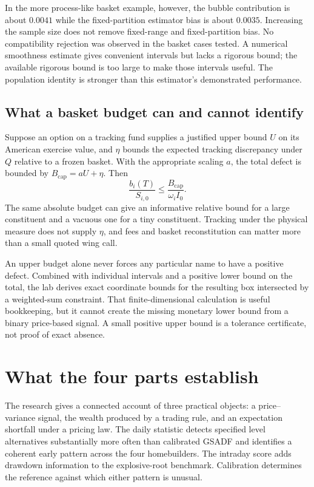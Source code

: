 In the more process-like basket example, however, the bubble contribution
is about $0.0041$ while the fixed-partition estimator bias is about
$0.0035$. Increasing the sample size does not remove fixed-range and
fixed-partition bias. No compatibility rejection was observed in the
basket cases tested. A numerical smoothness estimate gives convenient
intervals but lacks a rigorous bound; the available rigorous bound is too
large to make those intervals useful. The population identity is stronger
than this estimator's demonstrated performance.

\subsection{What a basket budget can and cannot identify}
Suppose an option on a tracking fund supplies a justified upper bound
$U$ on its American exercise value, and $\eta$ bounds the expected
tracking discrepancy under $Q$ relative to a frozen basket. With the
appropriate scaling $a$, the total defect is bounded by
$B_{\mathrm{cap}}=aU+\eta$. Then
\begin{equation}\label{eq:budget}
 \frac{b_i(T)}{S_{i,0}}
    \leq\frac{B_{\mathrm{cap}}}{\omega_i I_0}.
\end{equation}
The same absolute budget can give an informative relative bound for
a large constituent and a vacuous one for a tiny constituent. Tracking
under the physical measure does not supply $\eta$, and fees and basket
reconstitution can matter more than a small quoted wing call.

An upper budget alone never forces any particular name to have a
positive defect. Combined with individual intervals and a positive
lower bound on the total, the lab derives exact coordinate bounds for
the resulting box intersected by a weighted-sum constraint. That
finite-dimensional calculation is useful bookkeeping, but it cannot
create the missing monetary lower bound from a binary price-based
signal. A small positive upper bound is a tolerance certificate, not
proof of exact absence.

\section{What the four parts establish}\label{sec:remaining}
The research gives a connected account of three practical objects: a
price--variance signal, the wealth produced by a trading rule, and an
expectation shortfall under a pricing law. The daily statistic detects
specified level alternatives substantially more often than calibrated
GSADF and identifies a coherent early pattern across the four homebuilders.
The intraday score adds drawdown information to the explosive-root
benchmark. Calibration determines the reference against which either
pattern is unusual.

